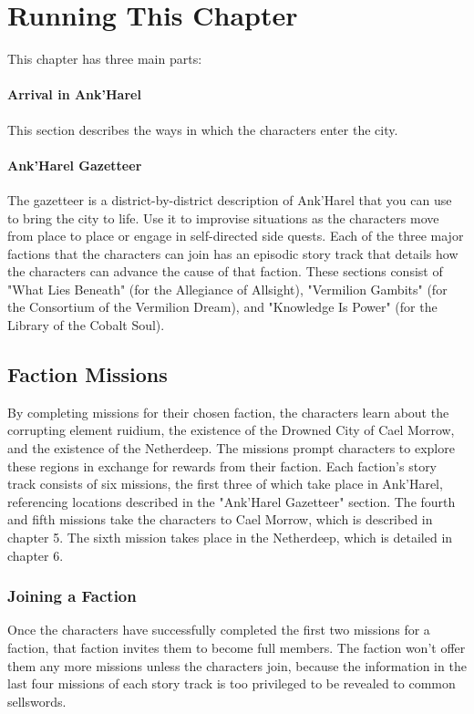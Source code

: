 \documentclass[10pt,a4,twoside,twocolumn,openany,nodeprecatedcode]{dndbook}
\begin{document}
\section{Running This Chapter}
This chapter has three main parts:
\paragraph{Arrival in Ank'Harel}
This section describes the ways in which the characters enter the city.
\paragraph{Ank'Harel Gazetteer}
The gazetteer is a district-by-district description of Ank'Harel that you can use to bring the city to life. Use it to improvise situations as the characters move from place to place or engage in self-directed side quests.
{{Each of the three major factions that the characters can join has an episodic story track that details how the characters can advance the cause of that faction. These sections consist of "What Lies Beneath" (for the Allegiance of Allsight), "Vermilion Gambits" (for the Consortium of the Vermilion Dream), and "Knowledge Is Power" (for the Library of the Cobalt Soul).}}
\subsection{Faction Missions}
By completing missions for their chosen faction, the characters learn about the corrupting element ruidium, the existence of the Drowned City of Cael Morrow, and the existence of the Netherdeep. The missions prompt characters to explore these regions in exchange for rewards from their faction.
Each faction's story track consists of six missions, the first three of which take place in Ank'Harel, referencing locations described in the "Ank'Harel Gazetteer" section. The fourth and fifth missions take the characters to Cael Morrow, which is described in chapter 5. The sixth mission takes place in the Netherdeep, which is detailed in chapter 6.
\subsubsection{Joining a Faction}
Once the characters have successfully completed the first two missions for a faction, that faction invites them to become full members. The faction won't offer them any more missions unless the characters join, because the information in the last four missions of each story track is too privileged to be revealed to common sellswords.
\end{document}
